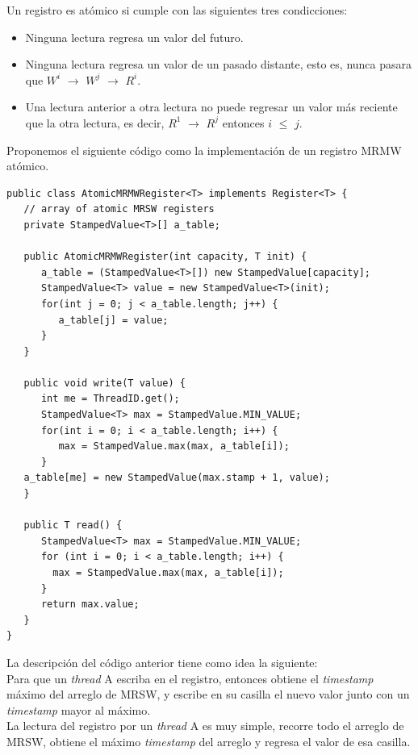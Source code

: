 \documentclass{article}
\begin{document}
\begin{enumerate}
{    Un registro es atómico si cumple con las siguientes tres
    condicciones:

    \begin{itemize}
      
    \item{Ninguna lectura regresa un valor del futuro.}
    \item{Ninguna lectura regresa un valor de un pasado distante, esto
        es, nunca pasara que $W^i$ $\rightarrow$ $W^j$ $\rightarrow$ $
        R^i$.}
      \item{Una lectura anterior a otra lectura no puede regresar un
          valor más reciente que la otra lectura, es decir, $R^1$
          $\rightarrow$ $R^j$ entonces $i$ $\leq$ $j$.}
    \end{itemize}
  
    Proponemos el siguiente código como la implementación de un
    registro MRMW atómico.
    
    \renewcommand{\lstlistingname}{}
\begin{lstlisting}[frame=single]
public class AtomicMRMWRegister<T> implements Register<T> {
   // array of atomic MRSW registers
   private StampedValue<T>[] a_table;

   public AtomicMRMWRegister(int capacity, T init) {
      a_table = (StampedValue<T>[]) new StampedValue[capacity];
      StampedValue<T> value = new StampedValue<T>(init);
      for(int j = 0; j < a_table.length; j++) {
         a_table[j] = value;
      }
   }

   public void write(T value) {
      int me = ThreadID.get();
      StampedValue<T> max = StampedValue.MIN_VALUE;
      for(int i = 0; i < a_table.length; i++) {
         max = StampedValue.max(max, a_table[i]);
      }
   a_table[me] = new StampedValue(max.stamp + 1, value);
   }

   public T read() {
      StampedValue<T> max = StampedValue.MIN_VALUE;
      for (int i = 0; i < a_table.length; i++) {
        max = StampedValue.max(max, a_table[i]);
      }
      return max.value;
   }
}
\end{lstlisting}
    La descripción del código anterior tiene como idea la siguiente:\\
    Para que un \textit{thread} A escriba en el registro, entonces
    obtiene el \textit{timestamp} máximo del arreglo de MRSW, y
    escribe en su casilla el nuevo valor junto con un
    \textit{timestamp} mayor al máximo.\\
    La lectura del registro por un \textit{thread} A es muy simple,
    recorre todo el arreglo de MRSW, obtiene el máximo
    \textit{timestamp} del arreglo y regresa el valor de esa
    casilla.\\

}
\end{enumerate}
\end{document}
